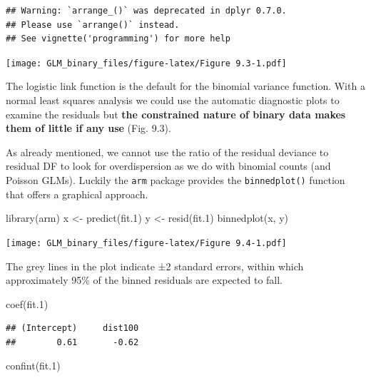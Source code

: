 \documentclass[
]{article}
\newenvironment{Shaded}{\begin{snugshade}}{\end{snugshade}}
\newcommand{\FloatTok}[1]{\textcolor[rgb]{0.00,0.00,0.81}{#1}}
\newcommand{\FunctionTok}[1]{\textcolor[rgb]{0.00,0.00,0.00}{#1}}
\newcommand{\NormalTok}[1]{#1}
\newcommand{\OtherTok}[1]{\textcolor[rgb]{0.56,0.35,0.01}{#1}}
\begin{document}
\begin{verbatim}
## Warning: `arrange_()` was deprecated in dplyr 0.7.0.
## Please use `arrange()` instead.
## See vignette('programming') for more help
\end{verbatim}

\texttt{[image: GLM\_binary\_files/figure-latex/Figure 9.3-1.pdf]}

The logistic link function is the default for the binomial variance
function. With a normal least squares analysis we could use the
automatic diagnostic plots to examine the residuals but \textbf{the
constrained nature of binary data makes them of little if any use} (Fig.
9.3).

As already mentioned, we cannot use the ratio of the residual deviance
to residual DF to look for overdispersion as we do with binomial counts
(and Poisson GLMs). Luckily the \texttt{arm} package provides the
\texttt{binnedplot()} function that offers a graphical approach.

\begin{Shaded}
\begin{Highlighting}[]
\FunctionTok{library}\NormalTok{(arm)}
\NormalTok{x }\OtherTok{\textless{}{-}} \FunctionTok{predict}\NormalTok{(fit}\FloatTok{.1}\NormalTok{)}
\NormalTok{y }\OtherTok{\textless{}{-}} \FunctionTok{resid}\NormalTok{(fit}\FloatTok{.1}\NormalTok{)}
\FunctionTok{binnedplot}\NormalTok{(x, y)}
\end{Highlighting}
\end{Shaded}

\texttt{[image: GLM\_binary\_files/figure-latex/Figure 9.4-1.pdf]}

The grey lines in the plot indicate ±2 standard errors, within which
approximately 95\% of the binned residuals are expected to fall.

\begin{Shaded}
\begin{Highlighting}[]
\FunctionTok{coef}\NormalTok{(fit}\FloatTok{.1}\NormalTok{)}
\end{Highlighting}
\end{Shaded}

\begin{verbatim}
## (Intercept)     dist100 
##        0.61       -0.62
\end{verbatim}

\begin{Shaded}
\begin{Highlighting}[]
\FunctionTok{confint}\NormalTok{(fit}\FloatTok{.1}\NormalTok{)}
\end{Highlighting}
\end{Shaded}
\end{document}
